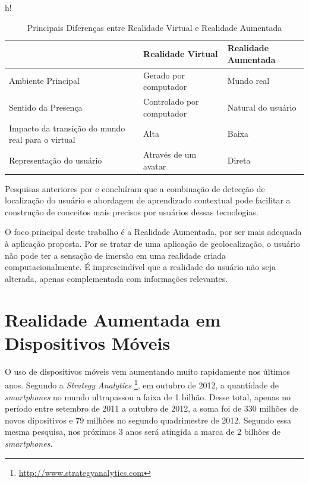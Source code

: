 \begin{table}{h!}
    \centering
    \caption{Principais Diferenças entre Realidade Virtual e Realidade Aumentada}
    \label{tab:dif_AR_VR}
    \begin{tabular}{| p{5cm} | p{5cm} | p{5cm} |}
         \hline
         & Realidade Virtual & Realidade Aumentada \\
         \hline
         Ambiente Principal & Gerado por computador & Mundo real \\
         \hline
         Sentido da Presença & Controlado por computador & Natural do usuário \\
         \hline
         Impacto da transição do mundo real para o virtual & Alta & Baixa \\
         \hline
         Representação do usuário & Através de um avatar & Direta \\
         \hline
    \end{tabular}
\end{table}

Pesquisas anteriores por \cite{AppsHandheldDevices} e \cite{FieldTrips}
concluíram que a combinação de detecção de localização do usuário e
abordagem de aprendizado contextual pode facilitar a construção de 
conceitos mais precisos por usuários dessas tecnologias.

O foco principal deste trabalho é a Realidade Aumentada, por ser mais adequada 
à aplicação proposta. Por se tratar de uma aplicação de geolocalização, o usuário
não pode ter a sensação de imersão em uma realidade criada computacionalmente. É
imprescindível que a realidade do usuário não seja alterada, apenas complementada 
com informações relevantes.






\section{Realidade Aumentada em Dispositivos Móveis}
\label{sec:ra_mobile}

O uso de dispositivos móveis vem aumentando muito rapidamente nos últimos anos.
Segundo a \textit{Strategy Analytics}
\footnote{\href{http://www.strategyanalytics.com}{http://www.strategyanalytics.com}},
em outubro de 2012, a quantidade de \textit{smartphones} no mundo ultrapassou a faixa
de 1 bilhão. Desse total, apenas no período entre setembro de 2011 a outubro de 2012, 
a soma foi de 330 milhões de novos dipositivos e 79 milhões no segundo quadrimestre de 2012.
Segundo essa mesma pesquisa, nos próximos 3 anos será atingida a marca de 2 bilhões de
\textit{smartphones}.



